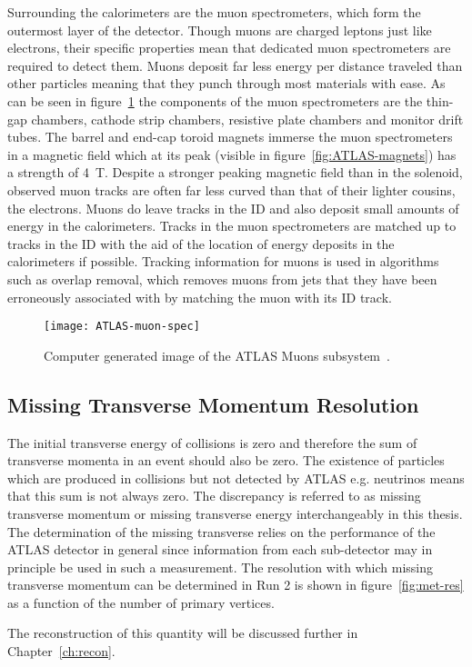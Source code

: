 Surrounding the calorimeters are the muon spectrometers, which form the
outermost layer of the detector. Though muons are charged leptons just like
electrons, their specific properties mean that dedicated muon spectrometers are
required to detect them. Muons deposit far less energy per distance traveled
than other particles meaning that they punch through most materials with ease.
As can be seen in figure~\ref{fig:ATLAS-muon} the components of the muon
spectrometers are the thin-gap chambers, cathode strip chambers, resistive plate
chambers and monitor drift tubes. The barrel and end-cap toroid magnets immerse
the muon spectrometers in a magnetic field which at its peak (visible in
figure~\ref{fig:ATLAS-magnets}) has a strength of 4~T. Despite a stronger
peaking magnetic field than in the solenoid, observed muon tracks are often far
less curved than that of their lighter cousins, the electrons. Muons do leave
tracks in the ID and also deposit small amounts of energy in the calorimeters.
Tracks in the muon spectrometers are matched up to tracks in the ID with the aid
of the location of energy deposits in the calorimeters if possible. Tracking
information for muons is used in algorithms such as overlap removal, which
removes muons from jets that they have been erroneously associated with by
matching the muon with its ID track.
\begin{figure}[ht]
  \centering
  \texttt{[image: ATLAS-muon-spec]}
  \caption[ATLAS muon subsystem]{Computer generated image of the ATLAS Muons
    subsystem~\cite{ATLAS-muon-fig}.}%
  \label{fig:ATLAS-muon}
\end{figure}

\subsection{Missing Transverse Momentum Resolution}
The initial transverse energy of collisions is zero and therefore the sum of
transverse momenta in an event should also be zero. The existence of particles
which are produced in collisions but not detected by ATLAS e.g. neutrinos means
that this sum is not always zero. The discrepancy is referred to as missing
transverse momentum or missing transverse energy interchangeably in this thesis.
The determination of the missing transverse relies on the performance of the
ATLAS detector in general since information from each sub-detector may in
principle be used in such a measurement. The resolution with which missing
transverse momentum can be determined in Run 2 is shown in
figure~\ref{fig:met-res} as a function of the number of primary vertices.

The reconstruction of this quantity will be discussed further in
Chapter~\ref{ch:recon}.

